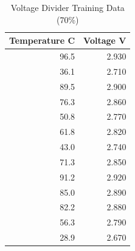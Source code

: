 \begin{table}[H]
\centering
\caption{Voltage Divider Training Data (70\%)}
\label{table:voltage_divider_training_table}
\begin{tabular}{rr}
\toprule
 Temperature C & Voltage V \\
\midrule
 96.5 & 2.930 \\
 36.1 & 2.710 \\
 89.5 & 2.900 \\
 76.3 & 2.860 \\
 50.8 & 2.770 \\
 61.8 & 2.820 \\
 43.0 & 2.740 \\
 71.3 & 2.850 \\
 91.2 & 2.920 \\
 85.0 & 2.890 \\
 82.2 & 2.880 \\
 56.3 & 2.790 \\
 28.9 & 2.670 \\
\bottomrule
\end{tabular}
\end{table}

